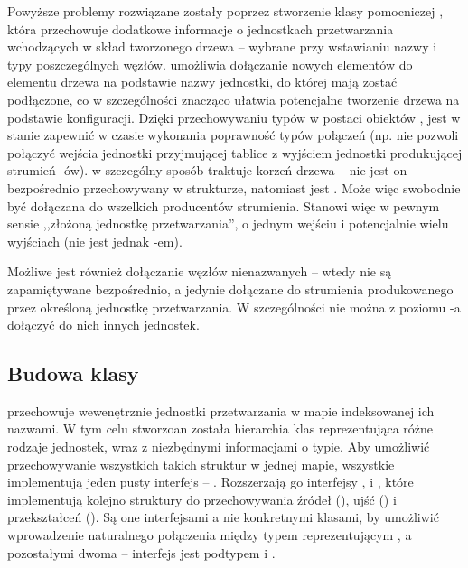 Powyższe problemy rozwiązane zostały poprzez stworzenie klasy pomocniczej , która
przechowuje dodatkowe informacje o jednostkach przetwarzania wchodzących w skład tworzonego drzewa
-- wybrane przy wstawianiu nazwy i typy poszczególnych węzłów.  umożliwia dołączanie
nowych elementów do elementu drzewa na podstawie nazwy jednostki, do której mają zostać podłączone,
co w szczególności znacząco ułatwia potencjalne tworzenie drzewa na podstawie konfiguracji. Dzięki
przechowywaniu typów w postaci obiektów ,  jest w stanie zapewnić w
czasie wykonania poprawność typów połączeń (np. nie pozwoli połączyć wejścia jednostki przyjmującej
tablice  z wyjściem jednostki produkującej strumień -ów).  w
szczególny sposób traktuje korzeń drzewa -- nie jest on bezpośrednio przechowywany w strukturze,
natomiast  jest . Może więc swobodnie być dołączana do wszelkich
producentów strumienia. Stanowi więc w pewnym sensie ,,złożoną jednostkę przetwarzania'', o jednym
wejściu i potencjalnie wielu wyjściach (nie jest jednak -em).

\begin{Note}
  Możliwe jest również dołączanie węzłów nienazwanych -- wtedy nie są zapamiętywane bezpośrednio, a
  jedynie dołączane do strumienia produkowanego przez określoną jednostkę przetwarzania. W
  szczególności nie można z poziomu -a dołączyć do nich innych jednostek.
\end{Note}


\subsection{Budowa klasy }

 przechowuje wewenętrznie jednostki przetwarzania w mapie indeksowanej ich nazwami. W
tym celu stworzoan została hierarchia klas reprezentująca różne rodzaje jednostek, wraz z
niezbędnymi informacjami o typie. Aby umożliwić przechowywanie wszystkich takich struktur w jednej
mapie, wszystkie implementują jeden pusty interfejs -- . Rozszerzają go interfejsy
,  i , które implementują kolejno struktury do
przechowywania źródeł (), ujść () i przekształceń
(). Są one interfejsami a nie konkretnymi klasami, by umożliwić wprowadzenie
naturalnego połączenia między typem reprezentującym , a pozostałymi dwoma --
interfejs  jest podtypem  i . 

